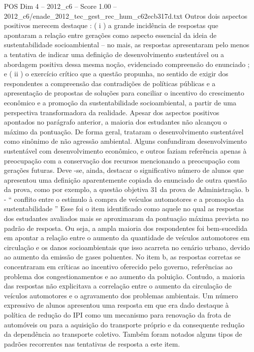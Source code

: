 \begin{textsample}{POS Dim 4 – 2012\_c6 – Score 1.00 – 2012\_c6/enade\_2012\_tec\_gest\_rec\_hum\_c62ecb317d.txt}
Outros dois aspectos positivos merecem destaque : ( i ) a grande incidência de respostas que apontaram a relação entre gerações como aspecto essencial da ideia de sustentabilidade socioambiental – no mais, as respostas apresentaram pelo menos a tentativa de indicar uma definição de desenvolvimento sustentável ou a abordagem positiva dessa mesma noção, evidenciado compreensão do enunciado ; e ( ii ) o exercício crítico que a questão propunha, no sentido de exigir dos respondentes a compreensão das contradições de políticas públicas e a apresentação de propostas de soluções para conciliar o incentivo do crescimento econômico e a promoção da sustentabilidade socioambiental, a partir de uma perspectiva transformadora da realidade.
Apesar dos aspectos positivos apontados no parágrafo anterior, a maioria dos estudantes não alcançou o máximo da pontuação.
De forma geral, trataram o desenvolvimento sustentável como sinônimo de não agressão ambiental.
Alguns confundiram desenvolvimento sustentável com desenvolvimento econômico, e outros faziam referência apenas à preocupação com a conservação dos recursos mencionando a preocupação com gerações futuras.
Deve -se, ainda, destacar o significativo número de alunos que apresentou uma definição aparentemente copiada do enunciado de outra questão da prova, como por exemplo, a questão objetiva 31 da prova de Administração. b - “ conflito entre o estímulo à compra de veículos automotores e a promoção da sustentabilidade ” Esse foi o item identificado como aquele no qual as respostas dos estudantes avaliados mais se aproximaram da pontuação máxima prevista no padrão de resposta.
Ou seja, a ampla maioria dos respondentes foi bem-sucedida em apontar a relação entre o aumento da quantidade de veículos automotores em circulação e os danos socioambientais que isso acarreta no cenário urbano, devido ao aumento da emissão de gases poluentes.
No item b, as respostas corretas se concentraram em críticas ao incentivo oferecido pelo governo, referências ao problema dos congestionamentos e ao aumento da poluição.
Contudo, a maioria das respostas não explicitava a correlação entre o aumento da circulação de veículos automotores e o agravamento dos problemas ambientais.
Um número expressivo de alunos apresentou uma resposta em que era dado destaque à política de redução do IPI como um mecanismo para renovação da frota de automóveis ou para a aquisição do transporte próprio e da consequente redução da dependência ao transporte coletivo.
Também foram notados alguns tipos de padrões recorrentes nas tentativas de resposta a este item.

\end{textsample}
